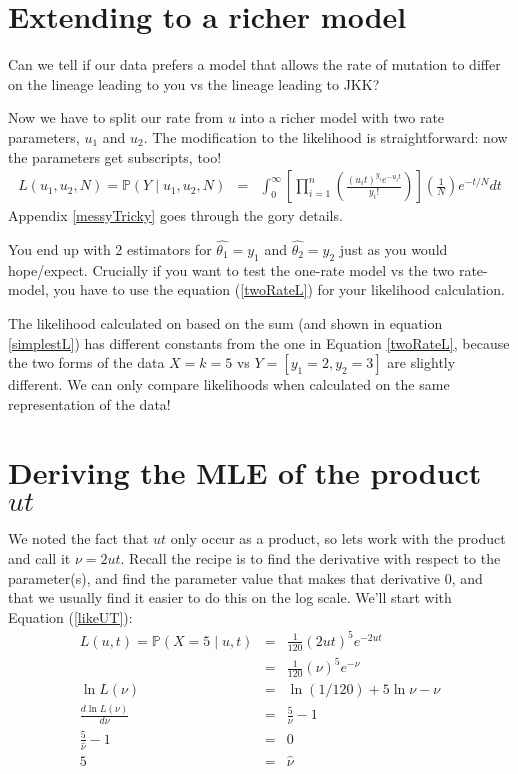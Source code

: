 \documentclass[11pt]{article}
\renewcommand{\Pr}{\mathbb{P}}
\begin{document}
\section{Extending to a richer model}
Can we tell if our data prefers a model that allows the rate of mutation to differ
on the lineage leading to you vs the lineage leading to JKK?

Now we have to split our rate from $u$ into a richer model with two rate parameters, $u_1$ and $u_2$.
The modification to the likelihood is straightforward: now the parameters
get subscripts, too!
\begin{eqnarray}
L(u_1, u_2, N)  = \Pr(Y \mid u_1, u_2, N)  & = &
  \int_{0}^{\infty} \left[ \prod_{i=1}^{n}\left(\frac{(u_it)^{y_i} e^{-u_it}}{y_i!} \right)\right] \left(\frac{1}{N}\right) e^{-t/N}dt \label{twoRateL}
\end{eqnarray}
Appendix \ref{messyTricky} goes through the gory details.

You end up with 2 estimators for $\hat{\theta_1} = y_1 $ and $\hat{\theta_2} = y_2$ just 
as you would hope/expect.
Crucially if you want to test the one-rate model vs the two rate-model, you have to use
the equation (\ref{twoRateL}) for your likelihood calculation.

The likelihood calculated on based on the sum (and shown in equation \ref{simplestL}) 
has different constants from the one in Equation \ref{twoRateL}, because
the two forms of the data $X=k=5$ vs $Y=[y_1=2, y_2=3]$ are slightly different.
We can only compare likelihoods when calculated on the same representation of the data!

\newpage
\appendix
\section{Deriving the MLE of the product $ut$}\label{appUT}
We noted the fact that $ut$ only occur as a product, so
lets work with the product and call it $\nu=2ut$.
Recall the recipe is to find the derivative with respect to the parameter(s),
and find the parameter value that makes that derivative 0, and 
that we usually find it easier to do this on the log scale.
We'll start with Equation (\ref{likeUT}):
\begin{eqnarray*}
L(u, t) = \Pr(X=5 \mid u, t) & = &\frac{1}{120}(2ut)^5 e^{-2ut} \\
& = &\frac{1}{120}(\nu)^5 e^{-\nu} \\
\ln L(\nu) & = & \ln{(1/120)} + 5\ln\nu - \nu\\
\frac{d \ln L(\nu)}{d \nu} & = & \frac{5}{\nu} - 1 \\
\frac{5}{\hat{\nu}} - 1 & = & 0 \\
5 & = & \hat{\nu} 
\end{eqnarray*}
\end{document}

